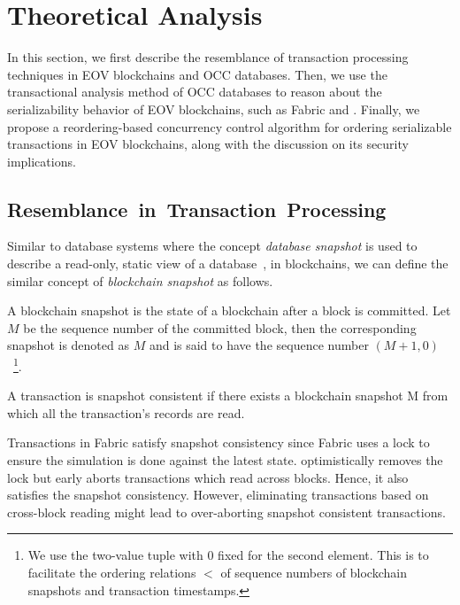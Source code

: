 \section{Theoretical Analysis}
\label{sec:txn:theory}

In this section, we first describe the resemblance of transaction processing
techniques in EOV blockchains and OCC databases.
%
Then, we use the transactional analysis method of OCC databases to
reason about the serializability behavior of EOV blockchains, such as Fabric and {\fabricPlusplus}.
%
Finally, we propose a reordering-based concurrency control algorithm for ordering
serializable transactions in EOV blockchains, 
along with the discussion on its security implications.

\subsection{Resemblance~in~Transaction~Processing}
\label{sec:txn:resembalance}
%
Similar to database systems where the concept \textit{database snapshot} is used
to describe a read-only, static view of a database~\cite{kung1981optimistic}, in blockchains, we can define the similar concept of \textit{blockchain snapshot} as follows.

\begin{definition}
  \label{defn:snapshot}
  A blockchain snapshot is the state of a blockchain after a block is committed.
  Let $M$ be the sequence number of the committed block, then the
  corresponding snapshot is denoted as $M$ and is said to have the sequence
  number $(M{+}1,0)$~\footnote{We use the two-value tuple with 0 fixed for the
    second element. This is to facilitate the ordering relations $<$ of sequence numbers of blockchain snapshots and
    transaction timestamps.}.
\end{definition}

\begin{definition}
  \label{defn:inconsistentExe}
  A transaction is snapshot consistent if there exists a blockchain snapshot M
  from which all the transaction's records are read.
\end{definition}

Transactions in Fabric satisfy snapshot consistency since Fabric uses a lock to
ensure the simulation is done against the latest state.
%
{\fabricPlusplus} optimistically removes the lock but early aborts transactions which read across blocks.
%
Hence, it also satisfies the snapshot consistency. 
%
However, eliminating transactions based on cross-block reading might
lead to over-aborting snapshot consistent transactions.

